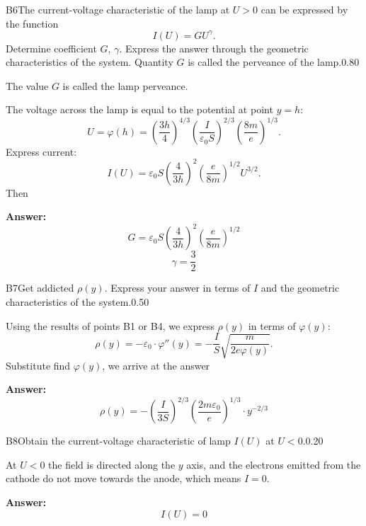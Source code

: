 \documentclass[11pt,a4paper]{article}
\begin{document}
\begin{solcard}{B6}{The current-voltage characteristic of the lamp at $U > 0$ can be expressed by the function $$I(U) = GU^\gamma.$$ Determine coefficient $G$, $\gamma$. Express the answer through the geometric characteristics of the system. Quantity $G$ is called the perveance of the lamp.}{0.80}

The value $G$ is called the lamp perveance.


The voltage across the lamp is equal to the potential at point $y = h$: $$U = \varphi(h) = \left(\dfrac{3h}{4}\right)^{4/3} \left(\dfrac{I}{\varepsilon_0S}\right)^{2/3}\left(\dfrac{8m}{e}\right)^{1/3}.$$Express current: $$I(U) =\varepsilon_0 S \left(\dfrac{4}{3h}\right)^{2}\left(\dfrac{e}{8m}\right)^{1/2} U^{3/2}.$$Then

\par\smallskip\noindent\textbf{Answer:} \[G = \varepsilon_0 S  \left(\dfrac{4}{3h}\right)^{2}\left(\dfrac{e}{8m}\right)^{1/2}\]\[\gamma = \dfrac{3}{2}\]
\end{solcard}

\begin{solcard}{B7}{Get addicted $\rho(y)$. Express your answer in terms of $I$ and the geometric characteristics of the system.}{0.50}

Using the results of points B1 or B4, we express $\rho(y)$ in terms of $\varphi(y)$: $$\rho(y)=-\varepsilon_0\cdot \varphi''(y) = -\frac{I}{S} \sqrt{\frac{m}{2e\varphi(y)}}.$$Substitute find $\varphi(y)$, we arrive at the answer

\par\smallskip\noindent\textbf{Answer:} $$\rho(y) =- \left(\dfrac{I}{3S}\right)^{2/3}\left(\dfrac{2m\varepsilon_0}{e}\right)^{1/3}\cdot y^{-2/3}$$
\end{solcard}

\begin{solcard}{B8}{Obtain the current-voltage characteristic of lamp $I(U)$ at $U < 0$.}{0.20}

At $U<0$ the field is directed along the $y$ axis, and the electrons emitted from the cathode do not move towards the anode, which means $I=0$.

\par\smallskip\noindent\textbf{Answer:} $$I(U) = 0$$
\end{solcard}
\end{document}
